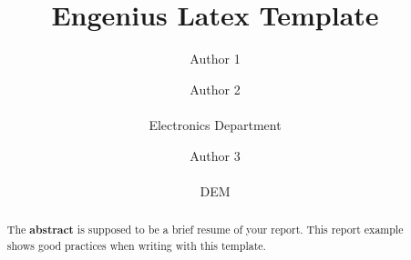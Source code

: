 \documentclass[]{magda}
\title{Engenius Latex Template}
\author{Author 1 \\ \email{emailauthor1@ua.pt}
	\and Author 2 \\ \email{emailauthor2@ua.pt} \\ Electronics Department
    \and Author 3 \\ \email{emailauthor3@ua.pt} \\ DEM
}
\begin{document}
\maketitle

\begin{abstract}

The \textbf{abstract} is supposed to be a brief resume of your report. This report example shows good practices when writing with this template.

\end{abstract}




\end{document}
